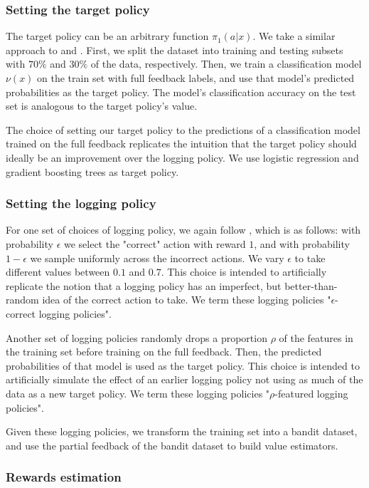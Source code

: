 \documentclass[sigplan,screen]{acmart}
\begin{document}
\subsubsection{Setting the target policy}
The target policy can be an arbitrary function $\pi_1(a|x)$. We take a similar approach to \cite{dudik} and \cite{pmlr-v97-vlassis19a}. First, we split the dataset into training and testing subsets with $70\%$ and $30\%$ of the data, respectively. Then, we train a classification model $\nu(x)$ on the train set with full feedback labels, and use that model's predicted probabilities as the target policy. The model's classification accuracy on the test set is analogous to the target policy's value.

The choice of setting our target policy to the predictions of a classification model trained on the full feedback replicates the intuition that the target policy should ideally be an improvement over the logging policy. We use logistic regression and gradient boosting trees as target policy.

\subsubsection{Setting the logging policy}
For one set of choices of logging policy, we again follow \cite{dudik}, which is as follows: with probability $\epsilon$ we select the "correct" action with reward $1$, and with probability $1 - \epsilon$ we sample uniformly across the incorrect actions. We vary $\epsilon$ to take different values between $0.1$ and $0.7$. This choice is intended to artificially replicate the notion that a logging policy has an imperfect, but better-than-random idea of the correct action to take. We term these logging policies "$\epsilon$-correct logging policies".

Another set of logging policies randomly drops a proportion $\rho$ of the features in the training set before training on the full feedback. Then, the predicted probabilities of that model is used as the target policy. This choice is intended to artificially simulate the effect of an earlier logging policy not using as much of the data as a new target policy. We term these logging policies "$\rho$-featured logging policies".

Given these logging policies, we transform the training set into a bandit dataset, and use the partial feedback of the bandit dataset to build value estimators.

\subsubsection{Rewards estimation}
\end{document}

